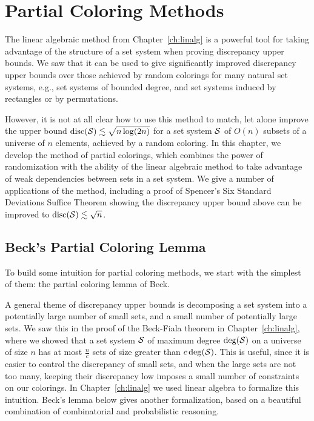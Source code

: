 \chapter{Partial Coloring Methods}\label{ch:partial}

The linear algebraic method from Chapter~\ref{ch:linalg} is a powerful
tool for taking advantage of the structure of a set system when
proving discrepancy upper bounds. We saw that it can be used to give significantly improved
discrepancy upper bounds 
over those 
achieved by random colorings for many natural set systems, e.g.,
set systems of bounded degree, and set systems induced by rectangles
or by permutations. 

However, it is not at all clear how to use this method to match, let alone improve the upper bound $\operatorname{disc}(\mathcal{S})
\lesssim \sqrt{n \log(2n)}$ for a set system $\mathcal{S}$ of $O(n)$ subsets of a
universe of $n$ elements, achieved by a random coloring.
In this
chapter, we develop the method of partial colorings, which combines the
power of randomization with the ability of the linear algebraic method
to take advantage of weak dependencies between sets in a set
system. 
We give a number of applications of the method, including a
proof of Spencer's Six Standard Deviations Suffice Theorem showing the discrepancy upper bound
above can be improved to $\operatorname{disc}(\mathcal{S}) \lesssim \sqrt{n}$.

\section{Beck's Partial Coloring Lemma}

To build some intuition for partial coloring methods, we start with
the simplest of them: the partial coloring lemma of Beck. 

A general
theme of discrepancy upper bounds is decomposing a set system into
a potentially large number of small sets, and a small number of
potentially large sets. We saw this in the proof of the Beck-Fiala
theorem in Chapter~\ref{ch:linalg}, where we showed that a set system
\(\mathcal{S}\) of maximum degree \(\operatorname{deg}(\mathcal{S})\) on a universe of size \(n\)
has at most \(\frac{n}{c}\) sets of size greater than
\(c\operatorname{deg}(\mathcal{S})\). This is useful, since it is easier to control the
discrepancy of small sets, and when the large sets are not too many,
keeping their discrepancy low imposes a small number of constraints on
our colorings. In Chapter~\ref{ch:linalg} we used linear algebra to
formalize this intuition. Beck's lemma below gives another
formalization, based on a beautiful combination of combinatorial and
probabilistic reasoning.

